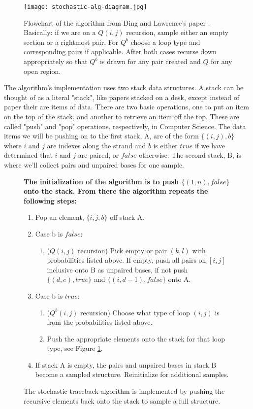 \begin{figure}
\centering
\texttt{[image: stochastic-alg-diagram.jpg]}
\caption{Flowchart of the algorithm from Ding and Lawrence's paper
  \cite{ding2003statistical}. Basically: if we are on a $Q(i,j)$
  recursion, sample either an empty section or a rightmost pair. For
  $Q^b$ choose a loop type and corresponding pairs if
  applicable. After both cases recurse down appropriately so that
  $Q^b$ is drawn for any pair created and $Q$ for any open region.}
\label{fig:stoch-flowchart}
\end{figure}

The algorithm's implementation uses two stack data structures. A stack
can be thought of as a literal "stack", like papers stacked on a desk,
except instead of paper their are items of data. There are two basic
operations, one to put an item on the top of the stack, and another to
retrieve an item off the top. These are called "push" and "pop"
operations, respectively, in Computer Science. The data items we will
be pushing on to the first stack, A, are of the form $\{(i,j), b\}$
where $i$ and $j$ are indexes along the strand and $b$ is either
$true$ if we have determined that $i$ and $j$ are paired, or $false$
otherwise. The second stack, B, is where we'll collect pairs and
unpaired bases for one sample.

\begin{figure}[h]
\bfseries\small
The initialization of the algorithm is to push $\{(1, n), false\}$
onto the stack. From there the algorithm repeats the following steps:
\begin{enumerate}
\item Pop an element, $\{i, j, b\}$ off stack A.
\item Case b is $false$:
\begin{enumerate}
\item ($Q(i,j)$ recursion) Pick empty or pair $(k,l)$ with
  probabilities listed above. If empty, push all pairs on $[i, j]$
  inclusive onto B as unpaired bases, if not push $\{(d, e), true\}$
  and $\{(i, d-1), false\}$ onto A.
\end{enumerate}
\item Case b is $true$:
\begin{enumerate}
\item ($Q^b(i,j)$ recursion) Choose what type of loop $(i,j)$ is from
  the probabilities listed above.
\item Push the appropriate elements onto the stack for that loop type,
  see Figure \ref{fig:stoch-flowchart}.
\end{enumerate}
\item If stack A is empty, the pairs and unpaired bases in stack B
  become a sampled structure. Reinitialize for additional samples.
\end{enumerate}

\caption{The stochastic traceback algorithm is implemented by pushing
  the recursive elements back onto the stack to sample a full structure. }
\label{fig:stochastic-pseudocode}
\end{figure}

